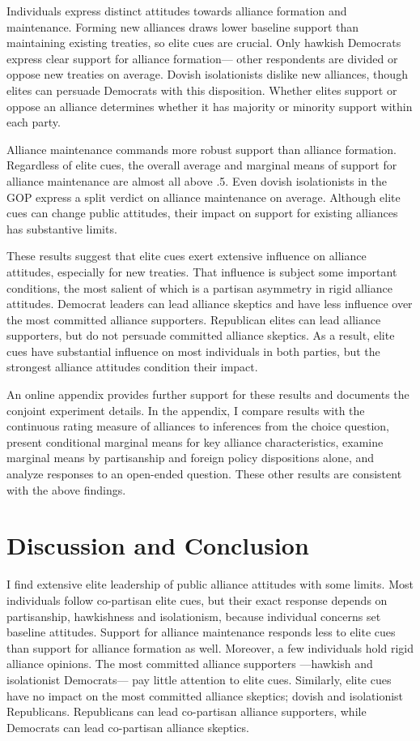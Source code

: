 \documentclass[12pt]{article}
\begin{document}
Individuals express distinct attitudes towards alliance formation and maintenance. 
Forming new alliances draws lower baseline support than maintaining existing treaties, so elite cues are crucial. 
Only hawkish Democrats express clear support for alliance formation--- other respondents are divided or oppose new treaties on average.
Dovish isolationists dislike new alliances, though elites can persuade Democrats with this disposition. 
Whether elites support or oppose an alliance determines whether it has majority or minority support within each party. 


Alliance maintenance commands more robust support than alliance formation. 
Regardless of elite cues, the overall average and marginal means of support for alliance maintenance are almost all above .5. 
Even dovish isolationists in the GOP express a split verdict on alliance maintenance on average.
Although elite cues can change public attitudes, their impact on support for existing alliances has substantive limits.


These results suggest that elite cues exert extensive influence on alliance attitudes, especially for new treaties.
That influence is subject some important conditions, the most salient of which is a partisan asymmetry in rigid alliance attitudes. 
Democrat leaders can lead alliance skeptics and have less influence over the most committed alliance supporters. 
Republican elites can lead alliance supporters, but do not persuade committed alliance skeptics. 
As a result, elite cues have substantial influence on most individuals in both parties, but the strongest alliance attitudes condition their impact. 


An online appendix provides further support for these results and documents the conjoint experiment details. 
In the appendix, I compare results with the continuous rating measure of alliances to inferences from the choice question, present conditional marginal means for key alliance characteristics, examine marginal means by partisanship and foreign policy dispositions alone, and analyze responses to an open-ended question. 
These other results are consistent with the above findings. 


\section{Discussion and Conclusion} 


I find extensive elite leadership of public alliance attitudes with some limits.  
Most individuals follow co-partisan elite cues, but their exact response depends on partisanship, hawkishness and isolationism, because individual concerns set baseline attitudes.
Support for alliance maintenance responds less to elite cues than support for alliance formation as well. 
Moreover, a few individuals hold rigid alliance opinions.  
The most committed alliance supporters ---hawkish and isolationist Democrats--- pay little attention to elite cues.
Similarly, elite cues have no impact on the most committed alliance skeptics; dovish and isolationist Republicans. 
Republicans can lead co-partisan alliance supporters, while Democrats can lead co-partisan alliance skeptics. 
\end{document}
